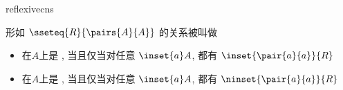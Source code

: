 \begin{modnl}[creators=Jinbo]{reflexive}{cns}
  \begin{definition}[id=reflexive.def]
  	形如 $\sseteq{R}{\pairs{A}{A}}$ 的关系被叫做
  	\begin{itemize}
  	\item 在$A$上是 , 当且仅当对任意 $\inset{a}A$, 都有 $\inset{\pair{a}{a}}{R}$
  	\item 在$A$上是 , 当且仅当对任意 $\inset{a}A$, 都有 $\ninset{\pair{a}{a}}{R}$ 
  	\end{itemize}
  \end{definition}
\end{modnl}
